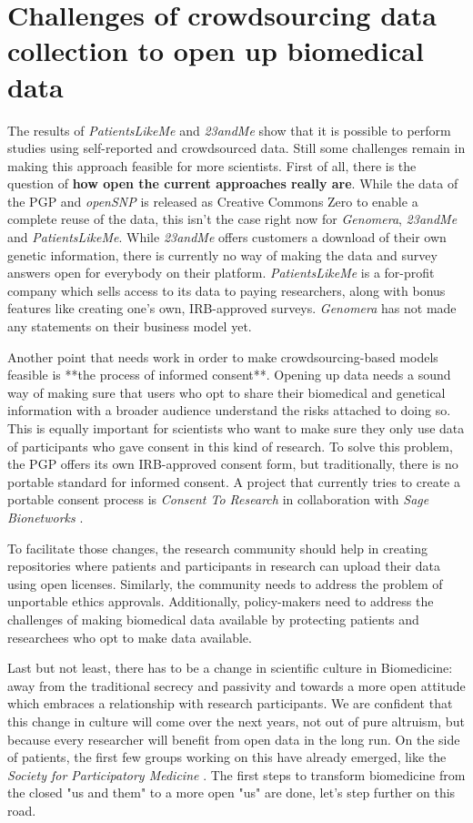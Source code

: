 \documentclass[runningheads,a4paper]{llncs}
\begin{document}
\section{Challenges of crowdsourcing data collection to open up biomedical data}
The results of \emph{PatientsLikeMe} and \emph{23andMe} show that it is possible to perform studies using self-reported and crowdsourced data. Still some challenges remain in making this approach feasible for more scientists. First of all, there is the question of \textbf{how open the current approaches really are}. While the data of the PGP and \emph{openSNP} is released as Creative Commons Zero to enable a complete reuse of the data, this isn't the case right now for \emph{Genomera}, \emph{23andMe} and \emph{PatientsLikeMe}. While \emph{23andMe} offers customers a download of their own genetic information, there is currently no way of making the data and survey answers open for everybody on their platform. \emph{PatientsLikeMe} is a for-profit company which sells access to its data to paying researchers, along with bonus features like creating one's own, IRB-approved surveys. \emph{Genomera} has not made any statements on their business model yet. 

Another point that needs work in order to make crowdsourcing-based models feasible is **the process of informed consent**. Opening up data needs a sound way of making sure that users who opt to share their biomedical and genetical information with a broader audience understand the risks attached to doing so. This is equally important for scientists who want to make sure they only use data of participants who gave consent in this kind of research. To solve this problem, the PGP offers its own IRB-approved consent form, but traditionally, there is no portable standard for informed consent. A project that currently tries to create a portable consent process is \emph{Consent To Research} \cite{weconsent} in collaboration with \emph{Sage Bionetworks} \cite{sage}. 

To facilitate those changes, the research community should help in creating repositories where patients and participants in research can upload their data using open licenses. Similarly, the community needs to address the problem of unportable ethics approvals. Additionally, policy-makers need to address the challenges of making biomedical data available by protecting patients and researchees who opt to make data available.

Last but not least, there has to be a change in scientific culture in Biomedicine: away from the traditional secrecy and passivity and towards a more open attitude which embraces a relationship with research participants. We are confident that this change in culture will come over the next years, not out of pure altruism, but because every researcher will benefit from open data in the long run. On the side of patients, the first few groups working on this have already emerged, like the \emph{Society for Participatory Medicine} \cite{partmed}. The first steps to transform biomedicine from the closed "us and them" to a more open "us" are done, let's step further on this road.
\end{document}
